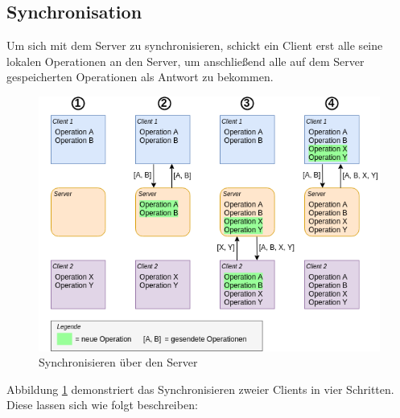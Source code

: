 \documentclass[a4paper, 12pt]{scrreprt}
\begin{document}
\subsection{Synchronisation}

Um sich mit dem Server zu synchronisieren, schickt ein Client erst alle seine lokalen Operationen an den Server, um anschließend alle auf dem Server gespeicherten Operationen als Antwort zu bekommen.

\begin{figure}[H]
	\centering
	\includegraphics[width=1\textwidth]{syncDiagram2.png}
	\caption{Synchronisieren über den Server}
	\label{fig:syncDiagram}
\end{figure}

Abbildung \ref{fig:syncDiagram} demonstriert das Synchronisieren zweier Clients in vier Schritten. Diese lassen sich wie folgt beschreiben:
\end{document}
